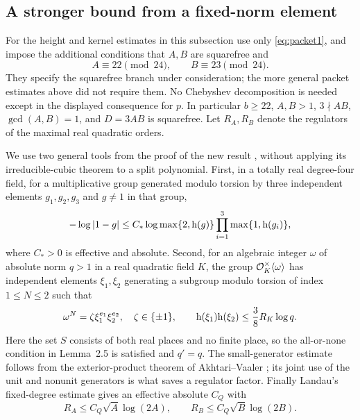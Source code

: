 \subsection{A stronger bound from a fixed-norm element}\label{sec:fixed-norm}
For the height and kernel estimates in this subsection use only
\eqref{eq:packet1}, and impose the additional conditions that $A,B$ are
squarefree and
\[
 A\equiv22\pmod {24},\qquad B\equiv23\pmod {24}.
\]
They specify the squarefree branch under consideration; the more general
packet estimates above did not require them. No Chebyshev decomposition
is needed except in the displayed consequence for $p$. In particular $b\ge22$,
$A,B>1$, $3\nmid AB$, $\gcd(A,B)=1$, and $D=3AB$ is squarefree.
Let $R_A,R_B$ denote the regulators of the maximal real quadratic orders.

We use two general tools from the proof of the new result
\cite[Theorem~2.4 and Lemma~2.5]{PastenNew}, without applying its
irreducible-cubic theorem to a split polynomial. First, in a totally real
degree-four field, for a multiplicative group generated modulo torsion
by three independent elements $g_1,g_2,g_3$ and $g\ne1$ in that group,
\begin{equation}\label{eq:group-approximation}
 -\log|1-g|\le C_*\log\max\{2,\mathrm h(g)\}
                  \prod_{i=1}^3\max\{1,\mathrm h(g_i)\},
\end{equation}
where $C_*>0$ is effective and absolute. Second, for an algebraic integer
$\omega$ of absolute norm $q>1$ in a real quadratic field $K$, the group
$\mathcal O_K^\times\langle\omega\rangle$ has independent elements $\xi_1,\xi_2$
generating a subgroup modulo torsion of index $1\le N\le2$ such that
\begin{equation}\label{eq:small-generators}
 \omega^N=\zeta\xi_1^{e_1}\xi_2^{e_2},\quad\zeta\in\{\pm1\},
 \qquad \mathrm h(\xi_1)\mathrm h(\xi_2)\le\frac38R_K\log q.
\end{equation}
Here the set $S$ consists of both real places and no finite place, so the
all-or-none condition in Lemma~2.5 is satisfied and $q'=q$.
The small-generator estimate follows from the exterior-product theorem
of Akhtari--Vaaler \cite[Theorem~1.2]{AV}; its joint use of the unit and
nonunit generators is what saves a regulator factor.
Finally Landau's fixed-degree estimate gives an effective absolute $C_Q$
with
\begin{equation}\label{eq:quadratic-regulator}
 R_A\le C_Q\sqrt A\log(2A),\qquad R_B\le C_Q\sqrt B\log(2B).
\end{equation}

